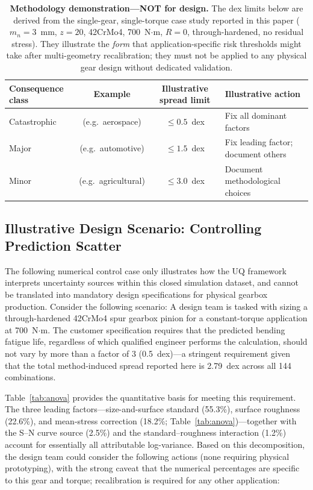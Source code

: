 \documentclass[twocolumn,12pt,a4paper]{article}
\begin{document}
\begin{table}[ht]
\centering
\caption{\textbf{Methodology demonstration---NOT for design.} The dex limits
below are derived from the single-gear, single-torque case study
reported in this paper ($m_n=3$~mm, $z=20$, 42CrMo4, 700~N$\cdot$m,
$R=0$, through-hardened, no residual stress). They illustrate the
\emph{form} that application-specific risk thresholds might take after
multi-geometry recalibration; they must not be applied to any physical
gear design without dedicated validation.
\label{tab:risk_thresholds}}
\footnotesize
\begin{tabular}{lccp{2.3cm}}
\toprule
Consequence class & Example & Illustrative spread limit & Illustrative action \\
\midrule
Catastrophic & (e.g.\ aerospace) & $\leq 0.5$~dex & Fix all dominant factors \\
Major & (e.g.\ automotive) & $\leq 1.5$~dex & Fix leading factor; document others \\
Minor & (e.g.\ agricultural) & $\leq 3.0$~dex & Document methodological choices \\
\bottomrule
\end{tabular}
\end{table}

\subsection{Illustrative Design Scenario: Controlling Prediction Scatter}

The following numerical control case only illustrates how the UQ
framework interprets uncertainty sources within this closed simulation
dataset, and cannot be translated into mandatory design specifications
for physical gearbox production. Consider the following scenario: A
design team is tasked with sizing a through-hardened 42CrMo4 spur
gearbox pinion for a constant-torque application at 700~N$\cdot$m.
The customer specification requires that the predicted bending fatigue
life, regardless of which qualified engineer performs the calculation,
should not vary by more than a factor of 3 (0.5~dex)---a stringent
requirement given that the total method-induced spread reported here is
2.79~dex across all 144 combinations.

Table~\ref{tab:anova} provides the quantitative basis for meeting this
requirement. The three leading factors---size-and-surface standard (55.3\%),
surface roughness (22.6\%), and mean-stress correction (18.2\%;
Table~\ref{tab:anova})---together with the S--N curve source (2.5\%)
and the standard--roughness interaction (1.2\%) account for
essentially all attributable log-variance. Based on this decomposition, the design team could
consider the following actions (none requiring physical prototyping),
with the strong caveat that the numerical percentages are specific
to this gear and torque; recalibration is required for any other
application:
\end{document}
